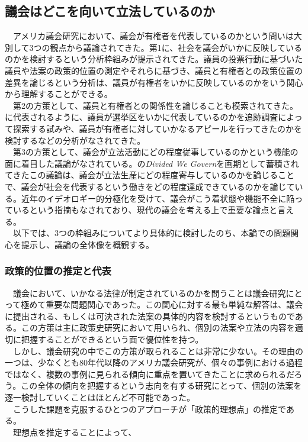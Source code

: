 \subsection{議会はどこを向いて立法しているのか}
　アメリカ議会研究において、議会が有権者を代表しているのかという問いは大別して3つの観点から議論されてきた。第1に、社会を議会がいかに反映しているのかを検討するという分析枠組みが提示されてきた。議員の投票行動に基づいた議員や法案の政策的位置の測定\citep*{Poole2017-ir,Caughey2016-ef}やそれらに基づき、議員と有権者との政策位置の差異を論じるという分析\citep*{Hall2015-kc,Hall2019-oe}は、議員が有権者をいかに反映しているのかをいう関心から理解することができる。\\
　第2の方策として、議員と有権者との関係性を論じることも模索されてきた。\citet*{Fenno1977-se,Fenno2000-up}に代表されるように、議員が選挙区をいかに代表しているのかを追跡調査によって探索する試みや、議員が有権者に対していかなるアピールを行ってきたのかを検討するなどの分析がなされてきた。\\
　第3の方策として、議会が立法活動にどの程度従事しているのかという機能の面に着目した議論がなされている。\citet*{Mayhew1991-rq,Mayhew2005-or}の\textit{Divided We Govern}を画期として蓄積されてきたこの議論は、議会が立法生産にどの程度寄与しているのかを論じることで、議会が社会を代表するという働きをどの程度達成できているのかを論じている。近年のイデオロギー的分極化を受けて、議会がこう着状態や機能不全に陥っているという指摘もなされており、現代の議会を考える上で重要な論点と言える。\\
　以下では、3つの枠組みについてより具体的に検討したのち、本論での問題関心を提示し、議論の全体像を概観する。\\

\subsubsection{政策的位置の推定と代表}
　議会において、いかなる法律が制定されているのかを問うことは議会研究にとって極めて重要な問題関心であった。この関心に対する最も単純な解答は、議会に提出される、もしくは可決された法案の具体的内容を検討するというものである。この方策は主に政策史研究において用いられ、個別の法案や立法の内容を適切に把握することができるという面で優位性を持つ。\\
　しかし、議会研究の中でこの方策が取られることは非常に少ない。その理由の一つは、少なくとも80年代以降のアメリカ議会研究が、個々の事例における過程ではなく、複数の事例に見られる傾向に重点を置いてきたことに求められるだろう。この全体の傾向を把握するという志向を有する研究にとって、個別の法案を逐一検討していくことはほとんど不可能であった。\\
　こうした課題を克服するひとつのアプローチが「政策的理想点」の推定である。\\
　理想点を推定することによって、\\

